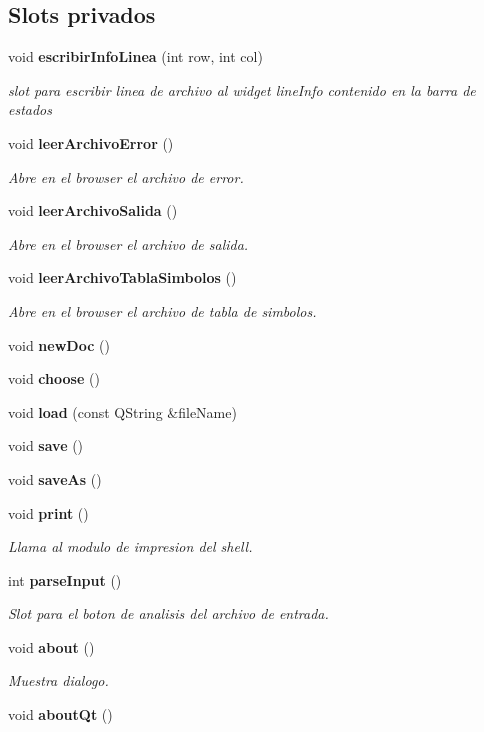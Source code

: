 \subsection*{Slots privados}
\begin{CompactItemize}
\item 
void {\bf escribir\-Info\-Linea} (int row, int col)
\begin{CompactList}\small\item\em slot para escribir linea de archivo al widget line\-Info contenido en la barra de estados \item\end{CompactList}\item 
void {\bf leer\-Archivo\-Error} ()
\begin{CompactList}\small\item\em Abre en el browser el archivo de error. \item\end{CompactList}\item 
void {\bf leer\-Archivo\-Salida} ()
\begin{CompactList}\small\item\em Abre en el browser el archivo de salida. \item\end{CompactList}\item 
void {\bf leer\-Archivo\-Tabla\-Simbolos} ()
\begin{CompactList}\small\item\em Abre en el browser el archivo de tabla de simbolos. \item\end{CompactList}\item 
void {\bf new\-Doc} ()
\item 
void {\bf choose} ()
\item 
void {\bf load} (const QString \&file\-Name)
\item 
void {\bf save} ()
\item 
void {\bf save\-As} ()
\item 
void {\bf print} ()
\begin{CompactList}\small\item\em Llama al modulo de impresion del shell. \item\end{CompactList}\item 
int {\bf parse\-Input} ()
\begin{CompactList}\small\item\em Slot para el boton de analisis del archivo de entrada. \item\end{CompactList}\item 
void {\bf about} ()
\begin{CompactList}\small\item\em Muestra dialogo. \item\end{CompactList}\item 
void {\bf about\-Qt} ()
\end{CompactItemize}
